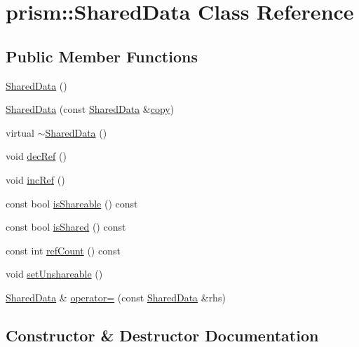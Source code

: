 \hypertarget{classprism_1_1_shared_data}{}\section{prism\+:\+:Shared\+Data Class Reference}
\label{classprism_1_1_shared_data}
\subsection*{Public Member Functions}
\begin{DoxyCompactItemize}
\item 
\hyperlink{classprism_1_1_shared_data_a68d7aab69703ca6152731f1e041d6949}{Shared\+Data} ()
\item 
\hyperlink{classprism_1_1_shared_data_a90f3a23c943c077a2d23776ba0b207c1}{Shared\+Data} (const \hyperlink{classprism_1_1_shared_data}{Shared\+Data} \&\hyperlink{namespaceprism_ae776f4cd825f79e7af1cf6ee1d90a209}{copy})
\item 
virtual \hyperlink{classprism_1_1_shared_data_ae726b22aee87a1551b46188482c92bc3}{$\sim$\+Shared\+Data} ()
\item 
void \hyperlink{classprism_1_1_shared_data_a270cf0cca02293714175d70acd92f049}{dec\+Ref} ()
\item 
void \hyperlink{classprism_1_1_shared_data_ae389431d573a0131b368c60531006fd2}{inc\+Ref} ()
\item 
const bool \hyperlink{classprism_1_1_shared_data_a2c995e732a31d8f9a29c2fd46e0256ff}{is\+Shareable} () const 
\item 
const bool \hyperlink{classprism_1_1_shared_data_a2b919077f094e7d8970721b77677b584}{is\+Shared} () const 
\item 
const int \hyperlink{classprism_1_1_shared_data_a4886256c18ff603dece3cad4fb4f579b}{ref\+Count} () const 
\item 
void \hyperlink{classprism_1_1_shared_data_a09445f57e7dea60a37477a36d74365ac}{set\+Unshareable} ()
\item 
\hyperlink{classprism_1_1_shared_data}{Shared\+Data} \& \hyperlink{classprism_1_1_shared_data_ab01467181ab0a5bd75afce8248c4bb65}{operator=} (const \hyperlink{classprism_1_1_shared_data}{Shared\+Data} \&rhs)
\end{DoxyCompactItemize}


\subsection{Constructor \& Destructor Documentation}
